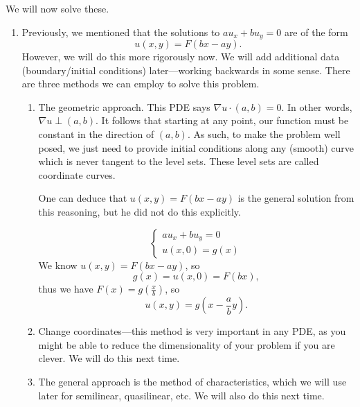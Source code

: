 We will now solve these.
\begin{enumerate}

	\item Previously, we mentioned that the solutions to \( au_{x} + bu_{y} = 0 \) are of the form
		\[ u(x, y) = F(bx - ay). \]
		However, we will do this more rigorously now. We will add additional data (boundary/initial conditions) later---working backwards in some sense. There are three methods we can employ to solve this problem.
		\begin{enumerate}
		
			\item The geometric approach. This PDE says \( \nabla u \cdot (a, b) = 0 \). In other words, \( \nabla u \perp (a, b) \). It follows that starting at any point, our function must be constant in the direction of \( (a, b) \). As such, to make the problem well posed, we just need to provide initial conditions along any (smooth) curve which is never tangent to the level sets. These level sets are called coordinate curves.

				One can deduce that \( u(x, y) = F(bx - ay) \) is the general solution from this reasoning, but he did not do this explicitly.
				\begin{example}
					\[ \left\{ 
							\begin{array}{c}
						a u_{x} + b u_{y} = 0 \\
						u(x, 0) = g(x)
					\end{array}\right. \]
					We know \( u(x, y) = F(bx - ay) \), so
					\[ g(x) = u(x, 0) = F(bx), \]
					thus we have \( F(x) = g \left( \frac{x}{b} \right) \), so
					\[ u(x, y) = g \left( x - \frac{a}{b} y \right). \]
				\end{example}
			\item Change coordinates---this method is very important in any PDE, as you might be able to reduce the dimensionality of your problem if you are clever. We will do this next time.
			\item The general approach is the method of characteristics, which we will use later for semilinear, quasilinear, etc. We will also do this next time.
		
		\end{enumerate}

\end{enumerate}
